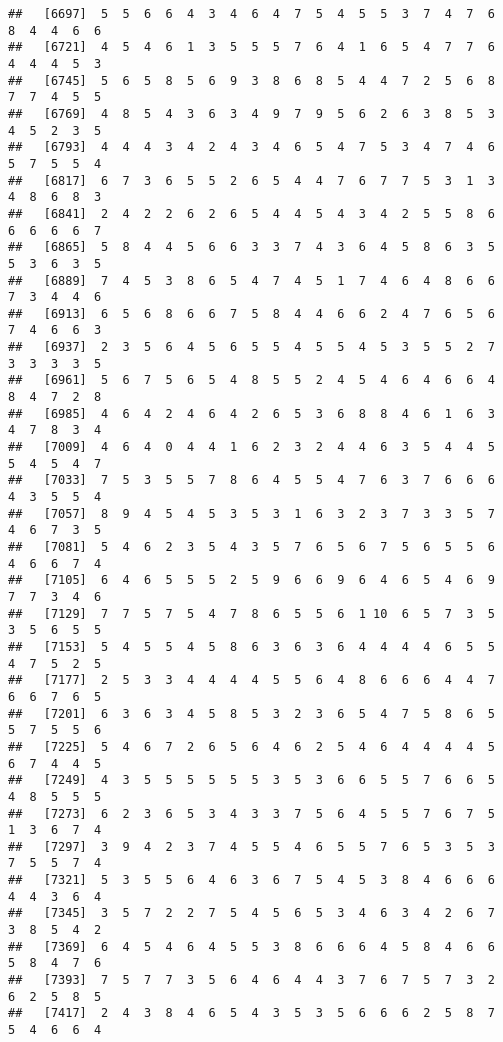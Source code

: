 \documentclass[
]{book}
\begin{document}
\begin{verbatim}
##   [6697]  5  5  6  6  4  3  4  6  4  7  5  4  5  5  3  7  4  7  6  8  4  4  6  6
##   [6721]  4  5  4  6  1  3  5  5  5  7  6  4  1  6  5  4  7  7  6  4  4  4  5  3
##   [6745]  5  6  5  8  5  6  9  3  8  6  8  5  4  4  7  2  5  6  8  7  7  4  5  5
##   [6769]  4  8  5  4  3  6  3  4  9  7  9  5  6  2  6  3  8  5  3  4  5  2  3  5
##   [6793]  4  4  4  3  4  2  4  3  4  6  5  4  7  5  3  4  7  4  6  5  7  5  5  4
##   [6817]  6  7  3  6  5  5  2  6  5  4  4  7  6  7  7  5  3  1  3  4  8  6  8  3
##   [6841]  2  4  2  2  6  2  6  5  4  4  5  4  3  4  2  5  5  8  6  6  6  6  6  7
##   [6865]  5  8  4  4  5  6  6  3  3  7  4  3  6  4  5  8  6  3  5  5  3  6  3  5
##   [6889]  7  4  5  3  8  6  5  4  7  4  5  1  7  4  6  4  8  6  6  7  3  4  4  6
##   [6913]  6  5  6  8  6  6  7  5  8  4  4  6  6  2  4  7  6  5  6  7  4  6  6  3
##   [6937]  2  3  5  6  4  5  6  5  5  4  5  5  4  5  3  5  5  2  7  3  3  3  3  5
##   [6961]  5  6  7  5  6  5  4  8  5  5  2  4  5  4  6  4  6  6  4  8  4  7  2  8
##   [6985]  4  6  4  2  4  6  4  2  6  5  3  6  8  8  4  6  1  6  3  4  7  8  3  4
##   [7009]  4  6  4  0  4  4  1  6  2  3  2  4  4  6  3  5  4  4  5  5  4  5  4  7
##   [7033]  7  5  3  5  5  7  8  6  4  5  5  4  7  6  3  7  6  6  6  4  3  5  5  4
##   [7057]  8  9  4  5  4  5  3  5  3  1  6  3  2  3  7  3  3  5  7  4  6  7  3  5
##   [7081]  5  4  6  2  3  5  4  3  5  7  6  5  6  7  5  6  5  5  6  4  6  6  7  4
##   [7105]  6  4  6  5  5  5  2  5  9  6  6  9  6  4  6  5  4  6  9  7  7  3  4  6
##   [7129]  7  7  5  7  5  4  7  8  6  5  5  6  1 10  6  5  7  3  5  3  5  6  5  5
##   [7153]  5  4  5  5  4  5  8  6  3  6  3  6  4  4  4  4  6  5  5  4  7  5  2  5
##   [7177]  2  5  3  3  4  4  4  4  5  5  6  4  8  6  6  6  4  4  7  6  6  7  6  5
##   [7201]  6  3  6  3  4  5  8  5  3  2  3  6  5  4  7  5  8  6  5  5  7  5  5  6
##   [7225]  5  4  6  7  2  6  5  6  4  6  2  5  4  6  4  4  4  4  5  6  7  4  4  5
##   [7249]  4  3  5  5  5  5  5  5  3  5  3  6  6  5  5  7  6  6  5  4  8  5  5  5
##   [7273]  6  2  3  6  5  3  4  3  3  7  5  6  4  5  5  7  6  7  5  1  3  6  7  4
##   [7297]  3  9  4  2  3  7  4  5  5  4  6  5  5  7  6  5  3  5  3  7  5  5  7  4
##   [7321]  5  3  5  5  6  4  6  3  6  7  5  4  5  3  8  4  6  6  6  4  4  3  6  4
##   [7345]  3  5  7  2  2  7  5  4  5  6  5  3  4  6  3  4  2  6  7  3  8  5  4  2
##   [7369]  6  4  5  4  6  4  5  5  3  8  6  6  6  4  5  8  4  6  6  5  8  4  7  6
##   [7393]  7  5  7  7  3  5  6  4  6  4  4  3  7  6  7  5  7  3  2  6  2  5  8  5
##   [7417]  2  4  3  8  4  6  5  4  3  5  3  5  6  6  6  2  5  8  7  5  4  6  6  4

\end{verbatim}
\end{document}
